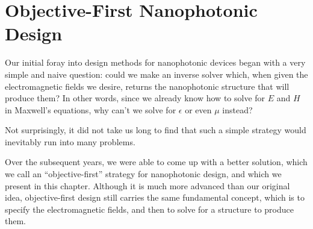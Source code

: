 \newcommand{\BE}{\begin{equation}}
\newcommand{\EE}{\end{equation}}
\newcommand{\BA}{\begin{eqnarray}}
\newcommand{\EA}{\end{eqnarray}}
\newcommand{\curl}{\nabla\times}
\newcommand{\minimize}[1]{\JLUminimize_{#1}\;&}
\newcommand{\subto}{\text{subject to}\;&}

\newcommand{\myfig}[2]{\begin{figure}[!h]\texttt{[image: fig/\#1.jpg]}\caption{#2}\label{fig:#1}\end{figure}}

\newcommand{\BI}{\begin{itemize}\item}
\renewcommand{\I}{\item}
\newcommand{\EI}{\end{itemize}}

\newcommand{\ER}[1]{\eqref{eq:#1}}
\newcommand{\SR}[1]{Section~\ref{sec:#1}}
\newcommand{\sR}[1]{section~\ref{sec:#1}}
\newcommand{\FR}[1]{Figure~\ref{fig:#1}}
\newcommand{\fR}[1]{figure~\ref{fig:#1}}
\chapter{Objective-First Nanophotonic Design}
\label{intro}

    

Our initial foray into design methods for nanophotonic devices
    began with a very simple and naive question: 
    could we make an inverse solver which,
    when given the electromagnetic fields we desire,
    returns the nanophotonic structure that will produce them\cite{opex3}?
In other words, since we already know how to solve for $E$ and $H$ 
    in Maxwell's equations, why can't we solve for $\epsilon$
    or even $\mu$ instead?

Not surprisingly, it did not take us long to find that such
    a simple strategy would inevitably run into many problems.

Over the subsequent years, we were able to come up with a better solution,
    which we call an ``objective-first'' strategy for nanophotonic design,
    and which we present in this chapter.
Although it is much more advanced than our original idea,
    objective-first design still carries the same fundamental concept,
    which is to specify the electromagnetic fields, and then
    to solve for a structure to produce them.
    
